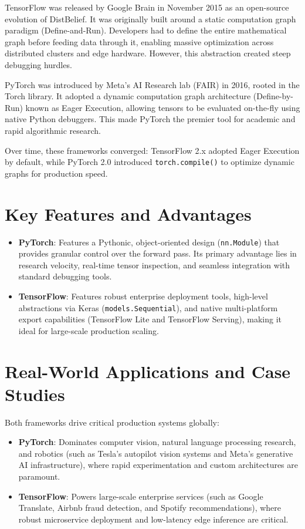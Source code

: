 \documentclass[11pt, a4paper]{article}
\begin{document}
TensorFlow was released by Google Brain in November 2015 as an open-source evolution of DistBelief. It was originally built around a static computation graph paradigm (Define-and-Run). Developers had to define the entire mathematical graph before feeding data through it, enabling massive optimization across distributed clusters and edge hardware. However, this abstraction created steep debugging hurdles.

PyTorch was introduced by Meta's AI Research lab (FAIR) in 2016, rooted in the Torch library. It adopted a dynamic computation graph architecture (Define-by-Run) known as Eager Execution, allowing tensors to be evaluated on-the-fly using native Python debuggers. This made PyTorch the premier tool for academic and rapid algorithmic research.

Over time, these frameworks converged: TensorFlow 2.x adopted Eager Execution by default, while PyTorch 2.0 introduced \texttt{torch.compile()} to optimize dynamic graphs for production speed.

\section{Key Features and Advantages}
\begin{itemize}
    \item \textbf{PyTorch}: Features a Pythonic, object-oriented design (\texttt{nn.Module}) that provides granular control over the forward pass. Its primary advantage lies in research velocity, real-time tensor inspection, and seamless integration with standard debugging tools.
    \item \textbf{TensorFlow}: Features robust enterprise deployment tools, high-level abstractions via Keras (\texttt{models.Sequential}), and native multi-platform export capabilities (TensorFlow Lite and TensorFlow Serving), making it ideal for large-scale production scaling.
\end{itemize}

\section{Real-World Applications and Case Studies}
Both frameworks drive critical production systems globally:
\begin{itemize}
    \item \textbf{PyTorch}: Dominates computer vision, natural language processing research, and robotics (such as Tesla's autopilot vision systems and Meta's generative AI infrastructure), where rapid experimentation and custom architectures are paramount.
    \item \textbf{TensorFlow}: Powers large-scale enterprise services (such as Google Translate, Airbnb fraud detection, and Spotify recommendations), where robust microservice deployment and low-latency edge inference are critical.
\end{itemize}
\end{document}
